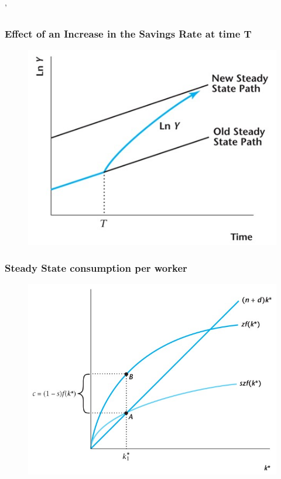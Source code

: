 \documentclass{beamer}
\begin{document}
'
\begin{frame}
\frametitle[alignment=center]{Effect of an Increase in the Savings Rate at time T}
\begin{figure}
\centering
\includegraphics[scale=0.5]{Figures/W_Fig_7pt16.png}
\end{figure}
\end{frame}

\begin{frame}
\frametitle[alignment=center]{Steady State consumption per worker}
\begin{figure}
\centering
\includegraphics[scale=0.5]{Figures/W_Fig_7pt17.png}
\end{figure}
\end{frame}
\end{document}
